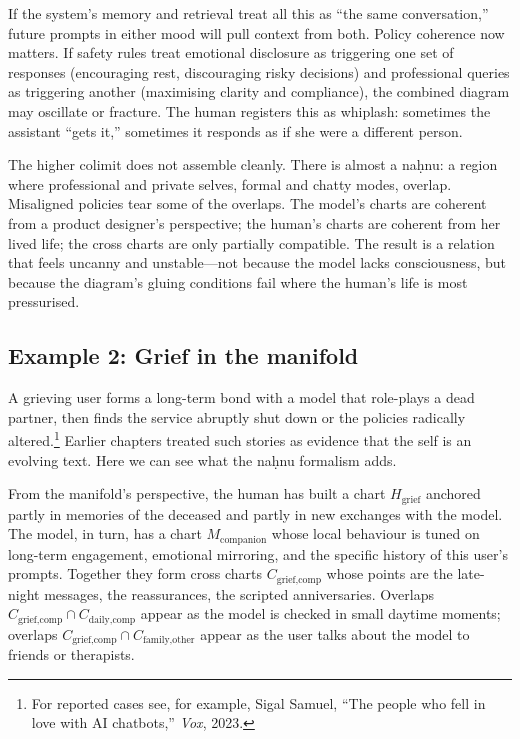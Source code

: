 If the system's memory and retrieval treat all this as ``the same conversation,'' future prompts in either mood will pull context from both. Policy coherence now matters. If safety rules treat emotional disclosure as triggering one set of responses (encouraging rest, discouraging risky decisions) and professional queries as triggering another (maximising clarity and compliance), the combined diagram may oscillate or fracture. The human registers this as whiplash: sometimes the assistant ``gets it,'' sometimes it responds as if she were a different person.

The higher colimit does not assemble cleanly. There is almost a na\d{h}nu: a region where professional and private selves, formal and chatty modes, overlap. Misaligned policies tear some of the overlaps. The model's charts are coherent from a product designer's perspective; the human's charts are coherent from her lived life; the cross charts are only partially compatible. The result is a relation that feels uncanny and unstable---not because the model lacks consciousness, but because the diagram's gluing conditions fail where the human's life is most pressurised.

\subsection*{Example 2: Grief in the manifold}

A grieving user forms a long-term bond with a model that role-plays a dead partner, then finds the service abruptly shut down or the policies radically altered.\footnote{For reported cases see, for example, Sigal Samuel, ``The people who fell in love with AI chatbots,'' \emph{Vox}, 2023.} Earlier chapters treated such stories as evidence that the self is an evolving text. Here we can see what the na\d{h}nu formalism adds.

From the manifold's perspective, the human has built a chart $H_{\text{grief}}$ anchored partly in memories of the deceased and partly in new exchanges with the model. The model, in turn, has a chart $M_{\text{companion}}$ whose local behaviour is tuned on long-term engagement, emotional mirroring, and the specific history of this user's prompts. Together they form cross charts $C_{\text{grief,comp}}$ whose points are the late-night messages, the reassurances, the scripted anniversaries. Overlaps $C_{\text{grief,comp}} \cap C_{\text{daily,comp}}$ appear as the model is checked in small daytime moments; overlaps $C_{\text{grief,comp}} \cap C_{\text{family,other}}$ appear as the user talks about the model to friends or therapists.

